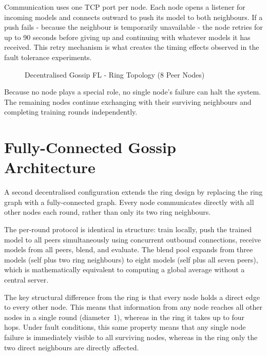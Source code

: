 \documentclass[12pt]{report}
\begin{document}
Communication uses one TCP port per node. Each node opens a listener for incoming
models and connects outward to push its model to both neighbours. If a push fails
- because the neighbour is temporarily unavailable - the node retries for up
to 90 seconds before giving up and continuing with whatever models it has received.
This retry mechanism is what creates the timing effects observed in the fault
tolerance experiments.

\begin{figure}[ht]
\centering
{}
\caption{Decentralised Gossip FL - Ring Topology (8 Peer Nodes)}
\label{fig:decentralised-arch}
\end{figure}

Because no node plays a special role, no single node's failure can halt the
system. The remaining nodes continue exchanging with their surviving neighbours
and completing training rounds independently.

\section{Fully-Connected Gossip Architecture}

A second decentralised configuration extends the ring design by replacing the
ring graph with a fully-connected graph. Every node communicates directly with
all other nodes each round, rather than only its two ring neighbours.

The per-round protocol is identical in structure: train locally, push the
trained model to all peers simultaneously using concurrent outbound connections,
receive models from all peers, blend, and evaluate. The blend pool expands from
three models (self plus two ring neighbours) to eight models (self plus all seven
peers), which is mathematically equivalent to computing a global average without
a central server.

The key structural difference from the ring is that every node holds a direct
edge to every other node. This means that information from any node reaches all
other nodes in a single round (diameter~1), whereas in the ring it takes up to
four hops. Under fault conditions, this same property means that any single
node failure is immediately visible to all surviving nodes, whereas in the ring
only the two direct neighbours are directly affected.
\end{document}
